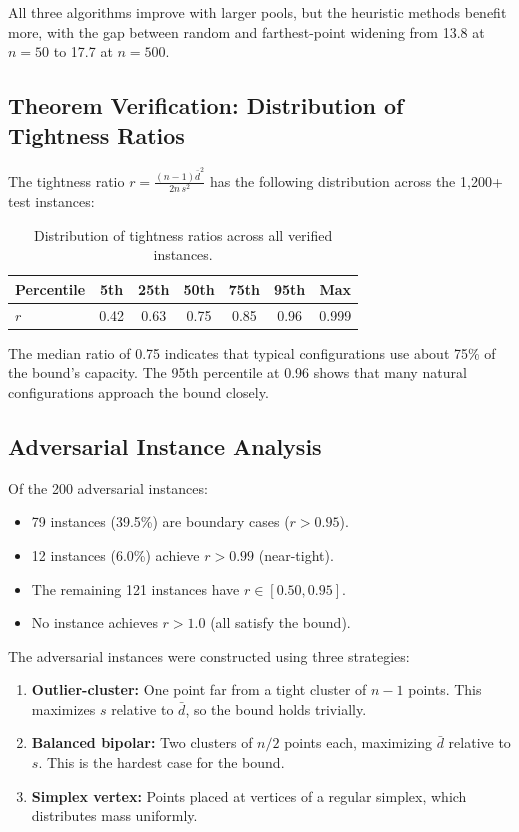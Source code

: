 \documentclass[11pt,a4paper]{article}
\begin{document}
All three algorithms improve with larger pools, but the
heuristic methods benefit more, with the gap between
random and farthest-point widening from 13.8 at $n=50$
to 17.7 at $n=500$.

\subsection{Theorem Verification: Distribution of Tightness Ratios}

The tightness ratio $r = \frac{(n-1)\bar{d}^2}{2n\,s^2}$
has the following distribution across the 1{,}200+ test
instances:

\begin{table}[h]
\centering
\caption{Distribution of tightness ratios across all
verified instances.}
\label{tab:tightness_dist}
\begin{tabular}{@{}lcccccc@{}}
\toprule
Percentile & 5th & 25th & 50th & 75th & 95th & Max \\
\midrule
$r$ & 0.42 & 0.63 & 0.75 & 0.85 & 0.96 & 0.999 \\
\bottomrule
\end{tabular}
\end{table}

The median ratio of 0.75 indicates that typical
configurations use about 75\% of the bound's capacity.
The 95th percentile at 0.96 shows that many natural
configurations approach the bound closely.

\subsection{Adversarial Instance Analysis}

Of the 200 adversarial instances:
\begin{itemize}[leftmargin=2em,itemsep=2pt]
\item 79 instances (39.5\%) are boundary cases
      ($r > 0.95$).
\item 12 instances (6.0\%) achieve $r > 0.99$ (near-tight).
\item The remaining 121 instances have $r \in [0.50, 0.95]$.
\item No instance achieves $r > 1.0$ (all satisfy the bound).
\end{itemize}

The adversarial instances were constructed using three
strategies:
\begin{enumerate}[leftmargin=2em,itemsep=2pt]
\item \textbf{Outlier-cluster:} One point far from a
      tight cluster of $n-1$ points.  This maximizes
      $s$ relative to $\bar{d}$, so the bound holds
      trivially.
\item \textbf{Balanced bipolar:} Two clusters of
      $n/2$ points each, maximizing $\bar{d}$ relative
      to $s$.  This is the hardest case for the bound.
\item \textbf{Simplex vertex:} Points placed at vertices
      of a regular simplex, which distributes mass
      uniformly.
\end{enumerate}
\end{document}
